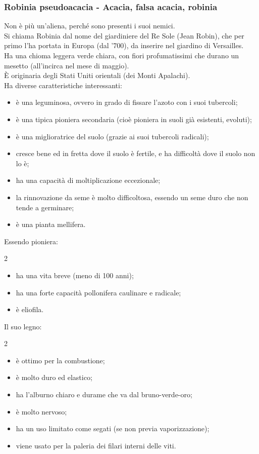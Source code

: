 \subsubsection{Robinia pseudoacacia - Acacia, falsa acacia, robinia}
Non è più un'aliena, perché sono presenti i suoi nemici.\\
Si chiama Robinia dal nome del giardiniere del Re Sole (Jean Robin), che per primo l'ha portata in Europa (dal '700), da inserire nel giardino di Versailles.\\
Ha una chioma leggera verde chiara, con fiori profumatissimi che durano un mesetto (all'incirca nel mese di maggio).\\
È originaria degli Stati Uniti orientali (dei Monti Apalachi).\\
Ha diverse caratteristiche interessanti:
\begin{itemize}[nosep]
    \item è una leguminosa, ovvero in grado di fissare l'azoto con i suoi tubercoli;
    \item è una tipica pioniera secondaria (cioè pioniera in suoli già esistenti, evoluti);
    \item è una miglioratrice del suolo (grazie ai suoi tubercoli radicali);
    \item cresce bene ed in fretta dove il suolo è fertile, e ha difficoltà dove il suolo non lo è;
    \item ha una capacità di moltiplicazione eccezionale;
    \item la rinnovazione da seme è molto difficoltosa, essendo un seme duro che non tende a germinare;
    \item è una pianta mellifera.   
\end{itemize}
Essendo pioniera:
\begin{multicols}{2}
\begin{itemize}[nosep]
    \item ha una vita breve (meno di 100 anni);
    \item ha una forte capacità pollonifera caulinare e radicale;
    \item è eliofila.
\end{itemize}
\end{multicols}
Il suo legno:
\begin{multicols}{2}
\begin{itemize}[nosep]
    \item è ottimo per la combustione;
    \item è molto duro ed elastico;
    \item ha l'alburno chiaro e durame che va dal bruno-verde-oro;
    \item è molto nervoso;
    \item ha un uso limitato come segati (se non previa vaporizzazione);
    \item viene usato per la paleria dei filari interni delle viti.
\end{itemize}
\end{multicols}
